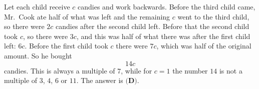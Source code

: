 Let each child receive $c$ candies and work backwards. Before the third child came, Mr.\ Cook ate half of what was left and the remaining $c$ went to the third child, so there were $2c$ candies after the second child left. Before that the second child took $c$, so there were $3c$, and this was half of what there was after the first child left: $6c$. Before the first child took $c$ there were $7c$, which was half of the original amount. So he bought
\[
14c
\]
candies. This is always a multiple of $7$, while for $c=1$ the number $14$ is not a multiple of $3$, $4$, $6$ or $11$. The answer is $\boxed{\textbf{(D)}}$.

